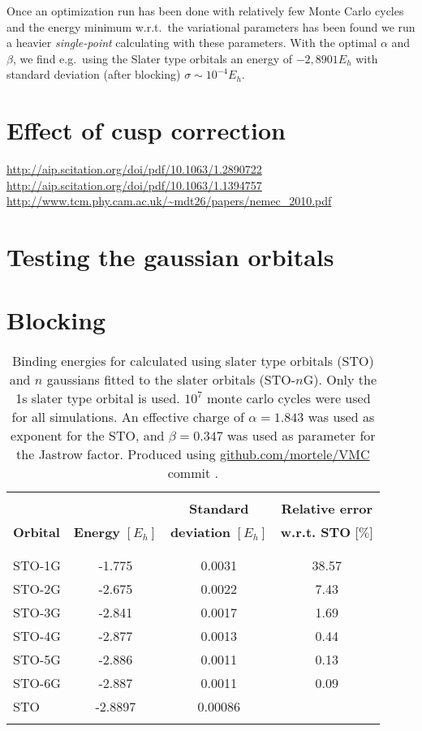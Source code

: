 \documentclass[../../master.tex]{subfiles}
\begin{document}
Once an optimization run has been done  with relatively few Monte Carlo cycles and the energy minimum w.r.t.\ the variational parameters has been found we run a heavier \emph{single-point} calculating with these parameters. With the optimal $\alpha$ and $\beta$, we find e.g.\ using the Slater type orbitals an energy of $-2,8901E_h$ with standard deviation (after blocking) $\sigma\sim10^{-4}E_h$. 


\section{Effect of cusp correction}
\url{http://aip.scitation.org/doi/pdf/10.1063/1.2890722}
\url{http://aip.scitation.org/doi/pdf/10.1063/1.1394757}
\url{http://www.tcm.phy.cam.ac.uk/~mdt26/papers/nemec_2010.pdf}



\section{Testing the gaussian orbitals}

\section{Blocking}


\begin{table}
\centering{}
\setlength\extrarowheight{2pt}
\begin{tabularx}{\textwidth}{X *{3}{S[table-format=-1.3,table-space-text-post=***]}}
\hline
\hline
\\[-0.9em]
                 &                          & \textbf{Standard}          & \textbf{Relative error}    \\
\textbf{Orbital} & \textbf{Energy} $[E_h]$  & \textbf{deviation} $[E_h]$ & \textbf{w.r.t. STO} [$\%$]  \\
\\[-0.9em]
\hline
\\[-0.9em]
STO-1G & -1.775  & 0.0031  &  38.57 \\
STO-2G & -2.675  & 0.0022  &   7.43 \\
STO-3G & -2.841  & 0.0017  &   1.69 \\
STO-4G & -2.877  & 0.0013  &   0.44 \\
STO-5G & -2.886  & 0.0011  &   0.13 \\
STO-6G & -2.887  & 0.0011  &   0.09 \\
STO    & -2.8897 & 0.00086 & \\
\\[-0.9em]
\hline
\end{tabularx}
\caption{Binding energies for  calculated using slater type orbitals (STO) and $n$ gaussians fitted to the slater orbitals (STO-$n$G). Only the 1s slater type orbital is used. $10^7$ monte carlo cycles were used for all simulations. An effective charge of $\alpha=1.843$ was used as exponent for the STO, and $\beta=0.347$ was used as parameter for the Jastrow factor. Produced using \url{github.com/mortele/VMC} commit . \label{tab:vmcv1}}
\end{table}
\end{document}
